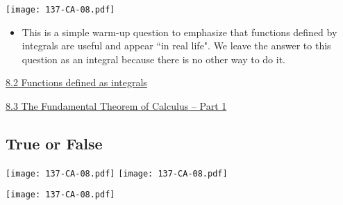 \documentclass[11pt]{article}
\newcommand{\nl}{\hfill \vspace{-1.1\baselineskip}} %
\newcommand{\vii}{\hspace{8mm} \href{https://www.youtube.com/watch?v=BQIiCjoFILs&list=PLlwePzQY_wW_8-sITAbG_GU2JgiuwXkDN&index=2}{8.2 Functions defined as integrals}}
\newcommand{\viii}{\hspace{8mm} \href{https://www.youtube.com/watch?v=JeKCipoy8bc&list=PLlwePzQY_wW_8-sITAbG_GU2JgiuwXkDN&index=3}{8.3 The Fundamental Theorem of Calculus -- Part 1}}
\begin{document}
\begin{center}
{ \texttt{[image: 137-CA-08.pdf]}} 
\end{center}

\begin{comments}
\nl
	\begin{itemize}
		\item This is a simple warm-up question to emphasize that functions defined by integrals are useful and appear ``in real life".  We leave the answer to this question as an integral because there is no other way to do it.
	\end{itemize}
\end{comments}

\begin{videos}
\vii

\viii
\end{videos}

\newpage
\subsection{True or False}

\begin{center}
{ \texttt{[image: 137-CA-08.pdf]}} \quad
{ \texttt{[image: 137-CA-08.pdf]}} 

{ \texttt{[image: 137-CA-08.pdf]}} 
\end{center}
\end{document}
